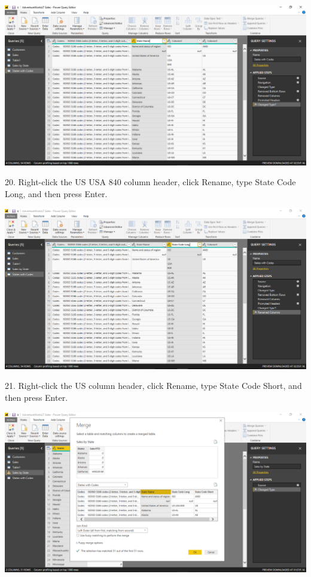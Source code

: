 	\begin{center}
	\includegraphics[width=17cm]{./Imagenes/Ejercicio1/Tarea4/13}
	\end{center}	

20. Right-click the US USA 840 column header, click Rename, type State Code Long, and then press
Enter.\\

	\begin{center}
	\includegraphics[width=17cm]{./Imagenes/Ejercicio1/Tarea4/14}
	\end{center}	

21. Right-click the US column header, click Rename, type State Code Short, and then press Enter.\\

	\begin{center}
	\includegraphics[width=17cm]{./Imagenes/Ejercicio1/Tarea4/16}
	\end{center}	

